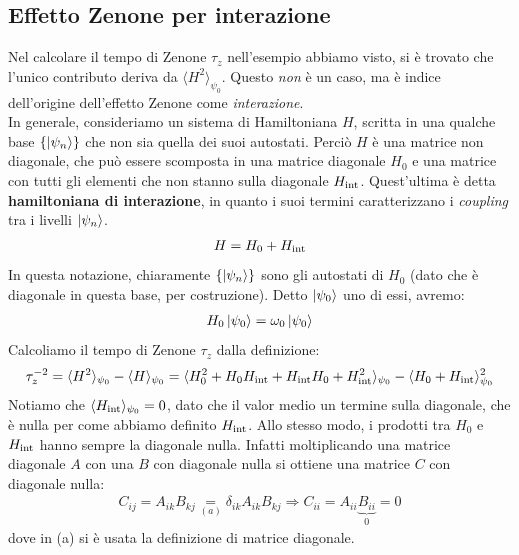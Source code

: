 \documentclass[../../InformazioneQuantistica.tex]{subfiles}
\begin{document}
\subsection{Effetto Zenone per interazione}
Nel calcolare il tempo di Zenone $\tau_z$ nell'esempio abbiamo visto, si è trovato che l'unico contributo deriva da $\langle H^2 \rangle_{\psi_0}$. Questo \textit{non} è un caso, ma è indice dell'origine dell'effetto Zenone come \textit{interazione}.\\
In generale, consideriamo un sistema di Hamiltoniana $H$, scritta in una qualche base $\{\Ket{\psi_n}\}$ che non sia quella dei suoi autostati. Perciò $H$ è una matrice non diagonale, che può essere scomposta in una matrice diagonale $H_0$ e una matrice con tutti gli elementi che non stanno sulla diagonale $H_{\operatorname{int}}$. Quest'ultima è detta \textbf{hamiltoniana di interazione}, in quanto i suoi termini caratterizzano i \textit{coupling} tra i livelli $\Ket{\psi_n}$.
\begin{align*}
H=H_0+ H_{\operatorname{int}}
\end{align*}
In questa notazione, chiaramente $\{\Ket{\psi_n}\}$ sono gli autostati di $H_0$ (dato che è diagonale in questa base, per costruzione). Detto $\Ket{\psi_0}$ uno di essi, avremo:
\begin{align*}
H_0 \Ket{\psi_0} = \omega_0 \Ket{\psi_0}
\end{align*}
Calcoliamo il tempo di Zenone $\tau_z$ dalla definizione:
\begin{align*}
\tau_z^{-2} = \langle H^2 \rangle_{\psi_0}-\langle H \rangle_{\psi_0} = \langle H_0^2 + H_0 H_{\operatorname{int}} + H_{\operatorname{int}}H_0 + H_{\operatorname{int}}^2 \rangle_{\psi_0}-\langle H_0 + H_{\operatorname{int}}\rangle_{\psi_0}^2
\end{align*}
Notiamo che $\langle H_{\operatorname{int}}\rangle_{\psi_0} = 0$, dato che il valor medio  un termine sulla diagonale, che è nulla per come abbiamo definito $H_{\operatorname{int}}$. Allo stesso modo, i prodotti tra $H_0$ e $H_{\operatorname{int}}$ hanno sempre la diagonale nulla. Infatti moltiplicando una matrice diagonale $A$ con una $B$ con diagonale nulla si ottiene una matrice $C$ con diagonale nulla:
\begin{align*}
C_{ij} = A_{ik}B_{kj}\underset{(a)}{=}\delta_{ik}A_{ik}B_{kj}\Rightarrow C_{ii}=A_{ii}\underbrace{B_{ii}}_{0}=0
\end{align*}
dove in (a) si è usata la definizione di matrice diagonale.\\
\end{document}
